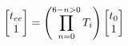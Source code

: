 \begin{equation}
  \centering
  \label{eq:base_ee_transformation}
  \left[
  \begin{matrix} 
    t_{ee}\\ 
    1
  \end{matrix}
  \right]
= \left(\prod_{n=0}^{6-n>0} T_i\right)
     \left[
     \begin{matrix}
       t_0 \\ 
       1
     \end{matrix}
     \right]
\end{equation}

